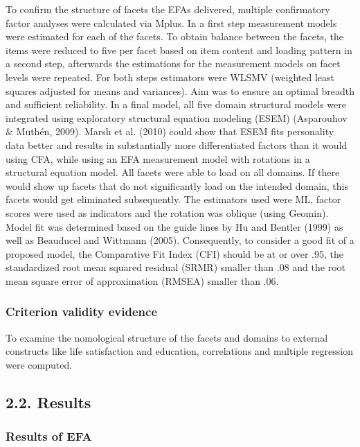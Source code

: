 \documentclass[man]{apa6}
\theoremstyle{definition}
\theoremstyle{definition}
\theoremstyle{definition}
\theoremstyle{remark}
\begin{document}
To confirm the structure of facets the EFAs delivered, multiple
confirmatory factor analyses were calculated via Mplus. In a first step
measurement models were estimated for each of the facets. To obtain
balance between the facets, the items were reduced to five per facet
based on item content and loading pattern in a second step, afterwards
the estimations for the measurement models on facet levels were
repeated. For both steps estimators were WLSMV (weighted least squares
adjusted for means and variances). Aim was to ensure an optimal breadth
and sufficient reliability. In a final model, all five domain structural
models were integrated using exploratory structural equation modeling
(ESEM) (Asparouhov \& Muthén, 2009). Marsh et al. (2010) could show that
ESEM fits personality data better and results in substantially more
differentiated factors than it would using CFA, while using an EFA
measurement model with rotations in a structural equation model. All
facets were able to load on all domains. If there would show up facets
that do not significantly load on the intended domain, this facets would
get eliminated subsequently. The estimators used were ML, factor scores
were used as indicators and the rotation was oblique (using Geomin).
Model fit was determined based on the guide lines by Hu and Bentler
(1999) as well as Beauducel and Wittmann (2005). Consequently, to
consider a good fit of a proposed model, the Comparative Fit Index (CFI)
should be at or over .95, the standardized root mean squared residual
(SRMR) smaller than .08 and the root mean square error of approximation
(RMSEA) smaller than .06.

\hypertarget{criterion-validity-evidence}{%
\subsubsection{Criterion validity
evidence}\label{criterion-validity-evidence}}

To examine the nomological structure of the facets and domains to
external constructs like life satisfaction and education, correlations
and multiple regression were computed.

\hypertarget{results}{%
\subsection{2.2. Results}\label{results}}

\hypertarget{results-of-efa}{%
\subsubsection{Results of EFA}\label{results-of-efa}}
\end{document}
